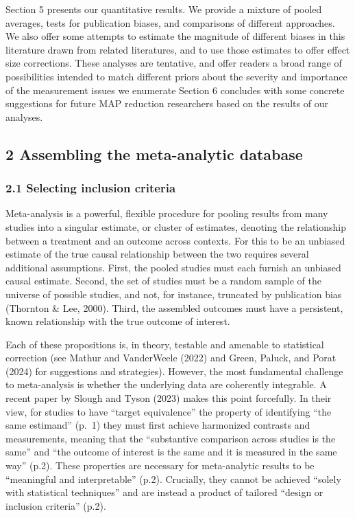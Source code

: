 \documentclass[
  man]{apa6}
\begin{document}
Section 5 presents our quantitative results. We provide a mixture of pooled averages, tests for publication biases, and comparisons of different approaches. We also offer some attempts to estimate the magnitude of different biases in this literature drawn from related literatures, and to use those estimates to offer effect size corrections. These analyses are tentative, and offer readers a broad range of possibilities intended to match different priors about the severity and importance of the measurement issues we enumerate Section 6 concludes with some concrete suggestions for future MAP reduction researchers based on the results of our analyses.

\subsection{2 Assembling the meta-analytic database}\label{assembling-the-meta-analytic-database}

\subsubsection{2.1 Selecting inclusion criteria}\label{selecting-inclusion-criteria}

Meta-analysis is a powerful, flexible procedure for pooling results from many studies into a singular estimate, or cluster of estimates, denoting the relationship between a treatment and an outcome across contexts. For this to be an unbiased estimate of the true causal relationship between the two requires several additional assumptions. First, the pooled studies must each furnish an unbiased causal estimate. Second, the set of studies must be a random sample of the universe of possible studies, and not, for instance, truncated by publication bias (Thornton \& Lee, 2000). Third, the assembled outcomes must have a persistent, known relationship with the true outcome of interest.

Each of these propositions is, in theory, testable and amenable to statistical correction (see Mathur and VanderWeele (2022) and Green, Paluck, and Porat (2024) for suggestions and strategies). However, the most fundamental challenge to meta-analysis is whether the underlying data are coherently integrable. A recent paper by Slough and Tyson (2023) makes this point forcefully. In their view, for studies to have ``target equivalence'' \textemdash the property of identifying ``the same estimand'' (p.~1) \textemdash they must first achieve harmonized contrasts and measurements, meaning that the ``substantive comparison across studies is the same'' and ``the outcome of interest is the same and it is measured in the same way'' (p.2). These properties are necessary for meta-analytic results to be ``meaningful and interpretable'' (p.2). Crucially, they cannot be achieved ``solely with statistical techniques'' and are instead a product of tailored ``design or inclusion criteria'' (p.2).
\end{document}
